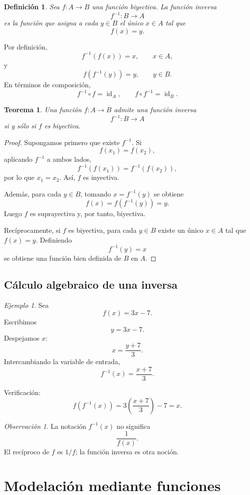 \documentclass[12pt]{article}
\newtheorem{definicion}{Definición}[section]
\newtheorem{teorema}{Teorema}[section]
\theoremstyle{remark}
\newtheorem{observacion}{Observación}[section]
\newtheorem{ejemplo}{Ejemplo}[section]
\newcommand{\id}{\operatorname{id}}
\begin{document}
\begin{definicion}
Sea $f:A\to B$ una función biyectiva. La función inversa
\[
f^{-1}:B\to A
\]
es la función que asigna a cada $y\in B$ el único $x\in A$ tal que
\[
f(x)=y.
\]
\end{definicion}

Por definición,
\[
f^{-1}(f(x))=x,\qquad x\in A,
\]
y
\[
f(f^{-1}(y))=y,\qquad y\in B.
\]
En términos de composición,
\[
f^{-1}\circ f=\id_A,
\qquad
f\circ f^{-1}=\id_B.
\]

\begin{teorema}
Una función $f:A\to B$ admite una función inversa
\[
f^{-1}:B\to A
\]
si y sólo si $f$ es biyectiva.
\end{teorema}

\begin{proof}
Supongamos primero que existe $f^{-1}$. Si
\[
f(x_1)=f(x_2),
\]
aplicando $f^{-1}$ a ambos lados,
\[
f^{-1}(f(x_1))=f^{-1}(f(x_2)),
\]
por lo que $x_1=x_2$. Así, $f$ es inyectiva.

Además, para cada $y\in B$, tomando $x=f^{-1}(y)$ se obtiene
\[
f(x)=f(f^{-1}(y))=y.
\]
Luego $f$ es suprayectiva y, por tanto, biyectiva.

Recíprocamente, si $f$ es biyectiva, para cada $y\in B$ existe un único
$x\in A$ tal que $f(x)=y$. Definiendo
\[
f^{-1}(y)=x
\]
se obtiene una función bien definida de $B$ en $A$.
\end{proof}

\subsection{Cálculo algebraico de una inversa}

\begin{ejemplo}
Sea
\[
f(x)=3x-7.
\]
Escribimos
\[
y=3x-7.
\]
Despejamos $x$:
\[
x=\frac{y+7}{3}.
\]
Intercambiando la variable de entrada,
\[
f^{-1}(x)=\frac{x+7}{3}.
\]

Verificación:
\[
f(f^{-1}(x))
=3\left(\frac{x+7}{3}\right)-7=x.
\]
\end{ejemplo}

\begin{observacion}
La notación $f^{-1}(x)$ no significa
\[
\frac{1}{f(x)}.
\]
El recíproco de $f$ es $1/f$; la función inversa es otra noción.
\end{observacion}

\section{Modelación mediante funciones}
\end{document}
